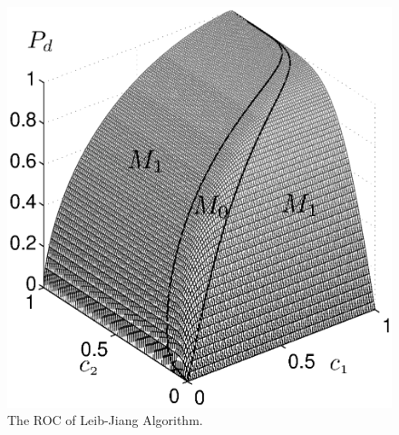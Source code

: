 \documentclass[12pt,journal,a4paper,twoside,onecolumn,draft]{IEEEtran}
\begin{document}
\begin{spacing}{2.5}
\begin{figure}[!t]
\centering
\includegraphics[width=12cm]{LJROC.eps}
\caption{The ROC of Leib-Jiang Algorithm.}
\label{pic: LJS}
\end{figure}


\end{spacing}
\end{document}
